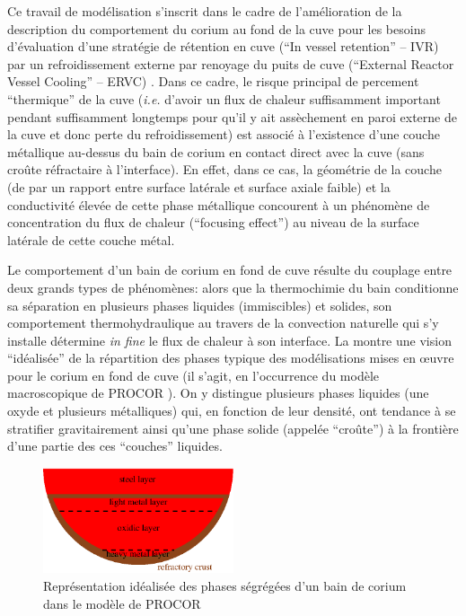 
Ce travail de modélisation s'inscrit dans le cadre de l'amélioration de la description du comportement du corium au fond de la cuve pour les besoins d'évaluation d'une stratégie de rétention en cuve (``In vessel retention'' -- IVR) par un refroidissement externe par renoyage du puits de cuve (``External Reactor Vessel Cooling'' -- ERVC) \cite{Theofanous1997, Kymalainen1997}. Dans ce cadre, le risque principal de percement ``thermique'' de la cuve (\textit{i.e.} d'avoir un flux de chaleur suffisamment important pendant suffisamment longtemps pour qu'il y ait assèchement en paroi externe de la cuve et donc perte du refroidissement) est associé à l'existence d'une couche métallique au-dessus du bain de corium en contact direct avec la cuve (sans croûte réfractaire à l'interface). En effet, dans ce cas, la géométrie de la couche (de par un rapport entre surface latérale et surface axiale faible) et la conductivité élevée de cette phase métallique concourent à un phénomène de concentration du flux de chaleur (``focusing effect'') au niveau de la surface latérale de cette couche métal.

Le comportement d'un bain de corium en fond de cuve résulte du couplage entre deux grands types de phénomènes: alors que la thermochimie du bain conditionne sa séparation en plusieurs phases liquides (immiscibles) et solides, son comportement thermohydraulique au travers de la convection naturelle qui s'y installe détermine \textit{in fine} le flux de chaleur à son interface. La  montre une vision ``idéalisée'' de la répartition des phases typique des modélisations mises en \oe uvre pour le corium en fond de cuve (il s'agit, en l’occurrence du modèle macroscopique de PROCOR \cite{LeTellier2015}). On y distingue plusieurs phases liquides (une oxyde et plusieurs métalliques) qui, en fonction de leur densité, ont tendance à se stratifier gravitairement ainsi qu'une phase solide (appelée ``croûte'') à la frontière d'une partie des ces ``couches'' liquides. 

\begin{figure}[H]
 \centering
 \includegraphics[width=0.5\textwidth]{Figures/multilayer.eps}
 \caption{Représentation idéalisée des phases ségrégées d'un bain de corium dans le modèle de PROCOR}
 \label{fig:corium_stratif}
\end{figure}

